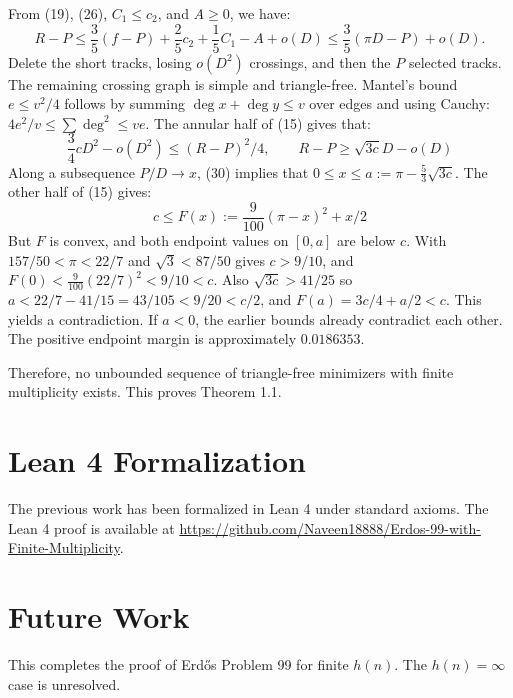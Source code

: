 \documentclass[10pt,reqno]{amsart}
\begin{document}
From (19), (26), $C_1 \le c_2$, and $A \ge 0$, we have:
\begin{equation}
    R - P \le \frac{3}{5} (f - P) + \frac{2}{5}c_2 + \frac{1}{5}C_1 - A + o(D) \le \frac{3}{5} (\pi D - P) + o(D).
\end{equation}
Delete the short tracks, losing $o(D^2)$ crossings, and then the $P$ selected tracks. The remaining crossing graph is simple and triangle-free. Mantel's bound $e \le v^2 / 4$ follows by summing $\deg x + \deg y \le v$ over edges and using Cauchy: $4e^2 / v \le \sum \deg^2 \le ve$. The annular half of (15) gives that:
\begin{equation}
    \frac{3}{4} cD^2 - o(D^2) \le (R - P)^2 / 4, \qquad R - P \ge \sqrt{3c} D - o(D)
\end{equation}
Along a subsequence $P / D \to x$, (30) implies that $0 \le x \le a := \pi - \frac{5}{3} \sqrt{3c}$. The other half of (15) gives:
\begin{equation}
    c \le F(x) := \frac{9}{100} (\pi - x)^2 + x / 2
\end{equation}
But $F$ is convex, and both endpoint values on $[0, a]$ are below $c$. With $157 / 50 < \pi < 22 / 7$ and $\sqrt{3} < 87/50$ gives $c > 9 / 10$, and $F(0) < \frac{9}{100}(22 / 7)^2 < 9 / 10 < c$. Also $\sqrt{3c} > 41 / 25$ so $a < 22 / 7 - 41 / 15 = 43 / 105 < 9 /20 < c / 2$, and $F(a) = 3c / 4 + a / 2 < c$. This yields a contradiction. If $a < 0$, the earlier bounds already contradict each other. The positive endpoint margin is approximately $0.0186353$.

Therefore, no unbounded sequence of triangle-free minimizers with finite multiplicity exists. This proves Theorem 1.1.



\section{Lean 4 Formalization}

The previous work has been formalized in Lean 4 under standard axioms. The Lean 4 proof is available at \url{https://github.com/Naveen18888/Erdos-99-with-Finite-Multiplicity}.


\section{Future Work}

This completes the proof of Erd\H{o}s Problem 99 for finite $h(n)$. The $h(n) = \infty$ case is unresolved.
\end{document}
